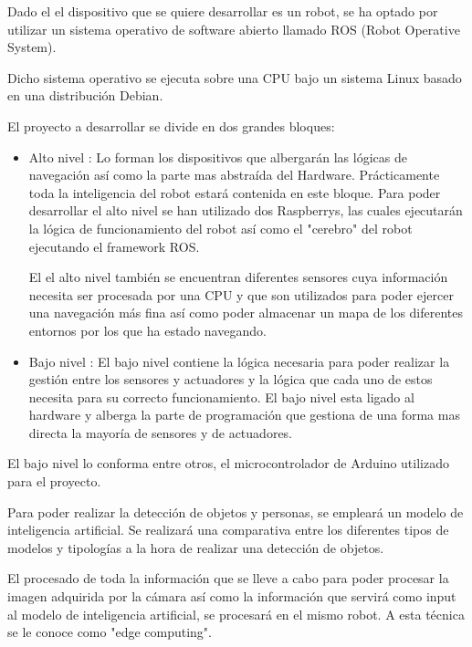 Dado el el dispositivo que se quiere desarrollar es un robot, se ha optado por utilizar un sistema operativo de software abierto llamado ROS (Robot Operative System).

Dicho sistema operativo se ejecuta sobre una CPU bajo un sistema Linux basado en una distribución Debian. 

El proyecto a desarrollar se divide en dos grandes bloques:

\begin{itemize}
\item Alto nivel : Lo forman los dispositivos que albergarán las lógicas de navegación así como la parte mas abstraída del Hardware. Prácticamente toda la inteligencia del robot estará contenida en este bloque. Para poder desarrollar el alto nivel se han utilizado dos Raspberrys, las cuales ejecutarán la lógica de funcionamiento del robot así como el "cerebro" del robot ejecutando el framework ROS. 

El el alto nivel también se encuentran diferentes sensores cuya información necesita ser procesada por una CPU y que son utilizados para poder ejercer una navegación más fina así como poder almacenar un mapa de los diferentes entornos por los que ha estado navegando.


\item Bajo nivel : El bajo nivel contiene la lógica necesaria para poder realizar la gestión entre los sensores y actuadores y la lógica que cada uno de estos necesita para su correcto funcionamiento. El bajo nivel esta ligado al hardware y alberga la parte de programación que gestiona de una forma mas directa la mayoría de sensores y de actuadores. 
\end{itemize}

El bajo nivel lo conforma entre otros, el microcontrolador de Arduino utilizado para el proyecto.

Para poder realizar la detección de objetos y personas, se empleará un modelo de inteligencia artificial. Se realizará una comparativa entre los diferentes tipos de modelos y tipologías a la hora de realizar una detección de objetos.

El procesado de toda la información que se lleve a cabo para poder procesar la imagen adquirida por la cámara así como la información que servirá como input al modelo de inteligencia artificial, se procesará en el mismo robot. A esta técnica se le conoce como "edge computing".